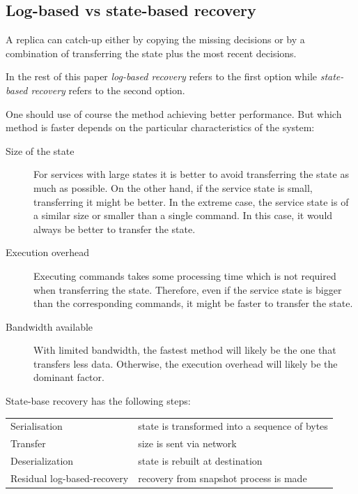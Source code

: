 \subsection{Log-based vs state-based recovery}
\label{subsec:log_based_state_based_recovery}
A replica can catch-up either by copying the missing decisions or by a combination of transferring the state plus the most recent decisions.

In the rest of this paper \emph{log-based recovery} refers to the first option while \emph{state-based recovery} refers to the second option.

One should use of course the method achieving better performance. But which method is faster depends on the particular characteristics of the system:

\begin{description}
  \item[Size of the state] For services with large states  it is better to avoid transferring the state as much as possible. On the other hand, if the service state is small, transferring it might be better. In the extreme case, the service state is of a similar size or smaller than a single command. In this case, it would always be better to transfer the state.

  \item[Execution overhead] Executing commands takes some processing time which is not required when transferring the state. Therefore, even if the service state is bigger than the corresponding commands, it might be faster to transfer the state.

  \item[Bandwidth available] With limited bandwidth, the fastest  method will likely be the one that transfers less data. Otherwise, the execution overhead will likely be the dominant factor.
\end{description}


State-base recovery has the following steps:

\vspace{-0.5em}
\begin{center}
  \footnotesize
  \begin{tabular}{ll}
    Serialisation               & state is transformed into a sequence of bytes \\
    Transfer                    & size is sent via network \\
    Deserialization             & state is rebuilt at destination \vspace{0.5em} \\
    Residual log-based-recovery & recovery from snapshot process is made \\
  \end{tabular}
\end{center}
\vspace{-0.5em}

